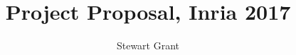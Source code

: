 \documentclass[10pt,twocolumn]{article}
\begin{document}
\title{Project Proposal, Inria 2017}
\author{Stewart Grant}
\date{}
\maketitle









\balance


\end{document}
